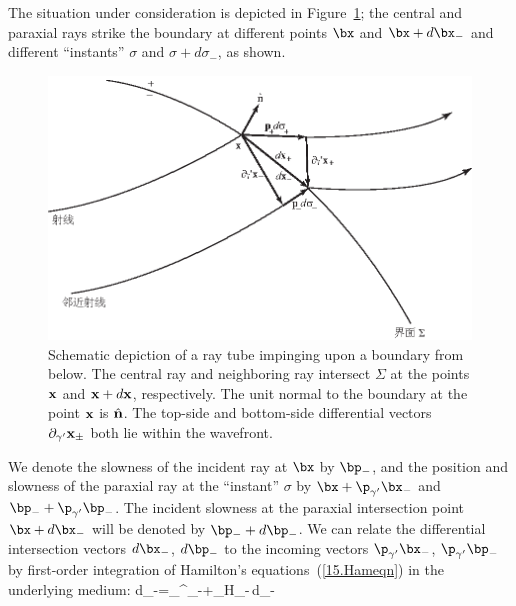 The situation under consideration
is depicted in Figure~\ref{15.fig.boundary};
the central and paraxial rays strike the boundary at different points
$\bx$ and $\bx+d\bx_-$ and different ``instants'' $\sigma$ and
$\sigma+d\sigma_-$, as shown.
\begin{figure}[!b]
\begin{center}
\includegraphics{../figures/chap15/fig04.eps}
\end{center}
\caption[boundary ray]
{\label{15.fig.boundary}
Schematic depiction of a ray tube impinging upon a boundary
from below.  The central ray and neighboring ray
intersect $\Sigma$ at the points ${\bf x}$ and ${\bf x}
+d{\bf x}$, respectively.  The unit normal to the
boundary at the point ${\bf x}$ is $\hat{\bf n}$.
The top-side and bottom-side differential vectors
$\partial_{\gamma'}{\bf x}_{\pm}$ both lie within
the wavefront.}
\end{figure}
We denote the slowness of the
incident ray at $\bx$ by
$\bp_{\raisebox{0.2 ex}{$\scriptstyle -$}}$, and the position and slowness
of the paraxial ray at the ``instant'' $\sigma$ by
$\bx+\p_{\gamma^{\prime}}\bx_-$ and
$\bp_{\raisebox{0.2 ex}{$\scriptstyle -$}}+
\p_{\gamma^{\prime}}\bp_{\raisebox{0.2 ex}{$\scriptstyle -$}}$.
The incident slowness at the paraxial intersection point $\bx+d\bx_-$
will be denoted by $\bp_{\raisebox{0.2 ex}{$\scriptstyle -$}}
+d\bp_{\raisebox{0.2 ex}{$\scriptstyle -$}}$.  We can relate the differential
intersection vectors $d\bx_-$,
$d\bp_{\raisebox{0.2 ex}{$\scriptstyle -$}}$ to the incoming vectors
$\p_{\gamma^{\prime}}\bx_-$,
$\p_{\gamma^{\prime}}\bp_{\raisebox{0.2 ex}{$\scriptstyle -$}}$
by first-order integration of Hamilton's equations~(\ref{15.Hameqn})
in the underlying medium:
\eq \label{15.farra1}
d\bx_-=\p_{\gamma^{\prime}}\bx_-+\p_{\subp}H_-\,d\sigma_-
